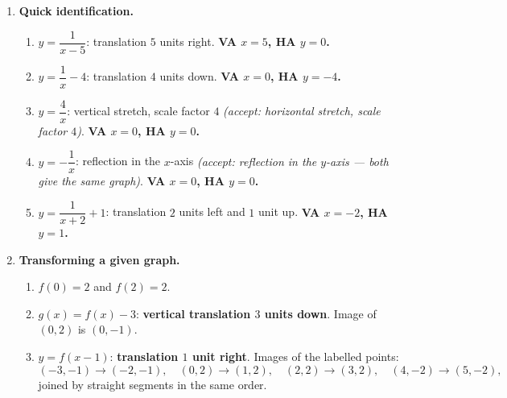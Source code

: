 \documentclass[12pt, twoside]{article}
\begin{document}
\begin{enumerate}[itemsep=0.3cm]
\begin{enumerate}[label=(\alph*), itemsep=0.2cm]
  \item \textbf{VA: $x=2$;\quad HA: $y=-1$.}

  \item $y$-intercept: $g(0)=\dfrac{3}{-2}-1=-\dfrac52$, point $\left(0,-\tfrac52\right)$.

  $x$-intercept: $\dfrac{3}{x-2}-1=0\Rightarrow\dfrac{3}{x-2}=1\Rightarrow x-2=3
  \Rightarrow x=5$, point $(5,0)$.

  \item $g(8)=\dfrac{3}{8-2}-1=\dfrac{1}{2}-1=-\dfrac12$.
\end{enumerate}

\medskip

\item \textbf{Quick identification.}

\begin{enumerate}[label=(\alph*), itemsep=0.2cm]
  \item $y=\dfrac{1}{x-5}$: translation $5$ units right. \textbf{VA $x=5$, HA $y=0$.}

  \item $y=\dfrac{1}{x}-4$: translation $4$ units down. \textbf{VA $x=0$, HA $y=-4$.}

  \item $y=\dfrac{4}{x}$: vertical stretch, scale factor $4$
  \emph{(accept: horizontal stretch, scale factor $4$)}. \textbf{VA $x=0$, HA $y=0$.}

  \item $y=-\dfrac{1}{x}$: reflection in the $x$-axis
  \emph{(accept: reflection in the $y$-axis --- both give the same graph)}.
  \textbf{VA $x=0$, HA $y=0$.}

  \item $y=\dfrac{1}{x+2}+1$: translation $2$ units left and $1$ unit up.
  \textbf{VA $x=-2$, HA $y=1$.}
\end{enumerate}

\medskip

\item \textbf{Transforming a given graph.}

\begin{enumerate}[label=(\alph*), itemsep=0.2cm]
  \item $f(0)=2$ and $f(2)=2$.

  \item $g(x)=f(x)-3$: \textbf{vertical translation $3$ units down}. Image of
  $(0,2)$ is $(0,-1)$.

  \item $y=f(x-1)$: \textbf{translation $1$ unit right}. Images of the labelled points:
  \[
  (-3,-1)\to(-2,-1),\quad (0,2)\to(1,2),\quad (2,2)\to(3,2),\quad (4,-2)\to(5,-2),
  \]
  joined by straight segments in the same order.
\end{enumerate}


\end{enumerate}
\end{document}
